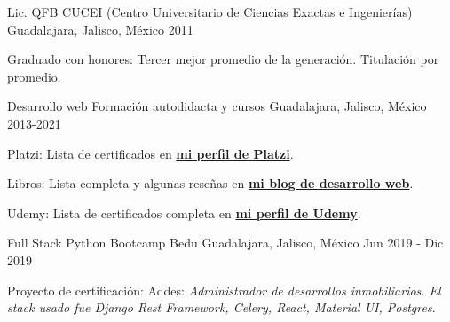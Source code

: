 

\begin{cventries}
  \cventry
    {Lic. QFB}
    {CUCEI (Centro Universitario de Ciencias Exactas e Ingenierías)}
    {Guadalajara, Jalisco, México}
    {2011}
    {
      \begin{cvitems}
        \item {Graduado con honores: Tercer mejor promedio de la generación. Titulación por promedio.}
      \end{cvitems}
    }

    \cventry
    {Desarrollo web}
    {Formación autodidacta y cursos}
    {Guadalajara, Jalisco, México}
    {2013-2021}
    {
      \begin{cvitems}
        \item {Platzi: Lista de certificados en \color{gray} \textbf{\href{https://platzi.com/@eduardo-zepeda/}{mi perfil de Platzi}}.}
        \item {Libros: Lista completa y algunas reseñas en \color{gray} \textbf{ \href{https://coffeebytes.dev/libros-que-he-leido-y-resenas/}{mi blog de desarrollo web}}.}
        \item {Udemy: Lista de certificados completa en \color{gray} \textbf{\href{https://www.udemy.com/user/carlos-eduardo-magallon-zepeda/}{mi perfil de Udemy}}.}
      \end{cvitems}
    }

    \cventry
    {Full Stack Python Bootcamp}
    {Bedu}
    {Guadalajara, Jalisco, México}
    {Jun 2019 - Dic 2019}
    {
      \begin{cvitems}
        \item {Proyecto de certificación: Addes: \textit{Administrador de desarrollos inmobiliarios. El stack usado fue Django Rest Framework, Celery, React, Material UI, Postgres.}}
      \end{cvitems}
    }
\end{cventries}